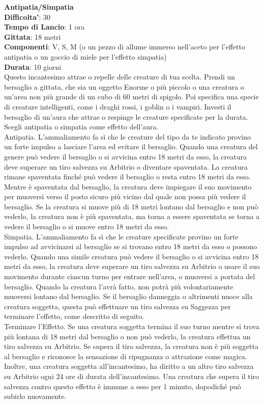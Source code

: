 \begin{multicols}{2}
\medskip\textbf{Antipatia/Simpatia}\\
\textbf{Difficolta'}: 30\\
\textbf{Tempo di Lancio}: 1 ora\\
\textbf{Gittata}: 18 metri\\
\textbf{Componenti}: V, S, M (o un pezzo di allume immerso nell’aceto per l’effetto antipatia o un goccio di miele per l’effetto simpatia)\\
\textbf{Durata}: 10 giorni\\
Questo incantesimo attrae o repelle delle creature di tua scelta. Prendi un bersaglio a gittata, che sia un oggetto Enorme o più piccolo o una creatura o un’area non più grande di un cubo di 60 metri di spigolo. Poi specifica una specie di creature intelligenti, come i draghi rossi, i goblin o i vampiri. Investi il bersaglio di un’aura che attrae o respinge le creature specificate per la durata. Scegli antipatia o simpatia come effetto dell’aura.\\
Antipatia. L’ammaliamento fa sì che le creature del tipo da te indicato provino un forte impulso a lasciare l’area ed evitare il bersaglio. Quando una creatura del genere può vedere il bersaglio o si avvicina entro 18 metri da esso, la creatura deve superare un tiro salvezza su Arbitrio o diventare spaventata. La creatura rimane spaventata finché può vedere il bersaglio o resta entro 18 metri da esso. Mentre è spaventata dal bersaglio, la creatura deve impiegare il suo movimento per muoversi verso il posto sicuro più vicino dal quale non possa più vedere il bersaglio. Se la creatura si muove più di 18 metri lontano dal bersaglio e non può vederlo, la creatura non è più spaventata, ma torna a essere spaventata se torna a vedere il bersaglio o si muove entro 18 metri da esso.\\
Simpatia. L’ammaliamento fa sì che le creature specificate provino un forte impulso ad avvicinarsi al bersaglio se si trovano entro 18 metri da esso o possono vederlo. Quando una simile creatura può vedere il bersaglio o si avvicina entro 18 metri da esso, la creatura deve superare un tiro salvezza su Arbitrio o usare il suo movimento durante ciascun turno per
entrare nell’area, o muoversi a portata del bersaglio. Quando la creatura l’avrà fatto, non potrà più volontariamente muoversi lontano dal bersaglio. Se il bersaglio danneggia o altrimenti nuoce alla creatura soggetta, questa può effettuare un tiro  salvezza su Saggezza per terminare l’effetto, come descritto di seguito.\\
Terminare l’Effetto. Se una creatura soggetta termina il suo turno mentre si trova più lontana di 18 metri dal bersaglio o non può vederlo, la creatura effettua un tiro salvezza su Arbitrio. Se supera il tiro salvezza, la creatura non è più soggetta al bersaglio e riconosce la sensazione di ripugnanza o attrazione come magica. Inoltre, una creatura soggetta all’incantesimo, ha diritto a un altro tiro salvezza su Arbitrio ogni 24 ore di durata dell’incantesimo. Una creatura che supera il tiro salvezza contro questo effetto è immune a esso per 1 minuto, dopodiché può subirlo nuovamente.


\end{multicols}
